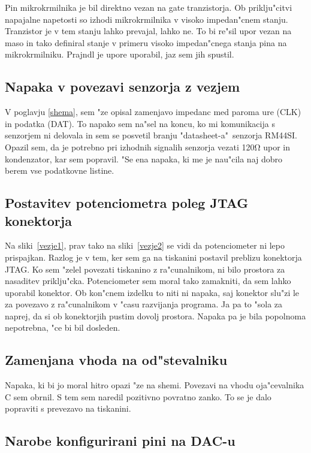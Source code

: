 \documentclass[a4paper]{article}
\begin{document}
Pin mikrokrmilnika je bil direktno vezan na gate tranzistorja. Ob priklju"citvi napajalne napetosti so izhodi mikrokrmilnika v visoko impedan"cnem stanju. Tranzistor je v tem stanju lahko prevajal, lahko ne. To bi re"sil upor vezan na maso in tako definiral stanje v primeru visoko impedan"cnega stanja pina na mikrokrmilniku. Prajndl je upore uporabil, jaz sem jih spustil. 


\subsection{Napaka v povezavi senzorja z vezjem}

V poglavju \ref{shema}, sem "ze opisal zamenjavo impedanc med paroma ure (CLK) in podatka (DAT). To napako sem na"sel na koncu, ko mi komunikacija s senzorjem ni delovala in sem se posvetil branju "\mbox{datasheet-a}"~senzorja RM44SI. Opazil sem, da je potrebno pri izhodnih signalih senzorja vezati 120$\mathrm{\Omega}$ upor in kondenzator, kar sem popravil. "Se ena napaka, ki me je nau"cila naj dobro berem vse podatkovne listine.


\subsection{Postavitev potenciometra poleg JTAG konektorja}

Na sliki~\ref{vezje1}, prav tako na sliki~\ref{vezje2} se vidi da potenciometer ni lepo prispajkan. Razlog je v tem, ker sem ga na tiskanini postavil preblizu konektorja JTAG. Ko sem "zelel povezati tiskanino z ra"cunalnikom, ni bilo prostora za nasaditev priklju"cka. Potenciometer sem moral tako zamakniti, da sem lahko uporabil konektor. Ob kon"cnem izdelku to niti ni napaka, saj konektor slu"zi le za povezavo z ra"cunalnikom v "casu razvijanja programa. Ja pa to "sola za naprej, da si ob konektorjih pustim dovolj prostora. Napaka pa je bila popolnoma nepotrebna, "ce bi bil dosleden.

\subsection{Zamenjana vhoda na od"stevalniku}

Napaka, ki bi jo moral hitro opazi "ze na shemi. Povezavi na vhodu oja"cevalnika C sem obrnil. S tem  sem naredil pozitivno povratno zanko. To se je dalo popraviti s prevezavo na tiskanini. 

\subsection{Narobe konfigurirani pini na DAC-u}
\end{document}
